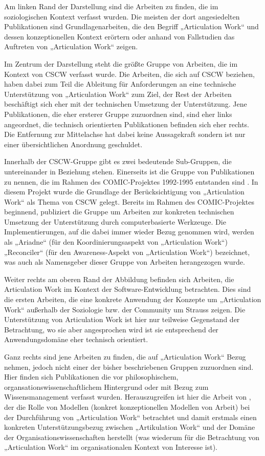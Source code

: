 Am linken Rand der Darstellung sind die Arbeiten zu finden, die im soziologischen Kontext verfasst wurden. Die meisten der dort angesiedelten Publikationen sind Grundlagenarbeiten, die den Begriff „Articulation Work“ und dessen konzeptionellen Kontext erörtern oder anhand von Fallstudien das Auftreten von „Articulation Work“ zeigen.

Im Zentrum der Darstellung steht die größte Gruppe von Arbeiten, die im Kontext von \gls{CSCW} verfasst wurde. Die Arbeiten, die sich auf \gls{CSCW} beziehen, haben dabei zum Teil die Ableitung für Anforderungen an eine technische Unterstützung von „Articulation Work“ zum Ziel, der Rest der Arbeiten beschäftigt sich eher mit der technischen Umsetzung der Unterstützung. Jene Publikationen, die eher ersterer Gruppe zuzuordnen sind, sind eher links angeordnet, die technisch orientierten Publikationen befinden sich eher rechts. Die Entfernung zur Mittelachse hat dabei keine Aussagekraft sondern ist nur einer übersichtlichen Anordnung geschuldet. 

Innerhalb der \gls{CSCW}-Gruppe gibt es zwei bedeutende Sub-Gruppen, die untereinander in Beziehung stehen. Einerseits ist die Gruppe von Publikationen zu nennen, die im Rahmen des COMIC-Projektes 1992-1995 entstanden sind \citep{Rodden95}. In diesem Projekt wurde die Grundlage der Berücksichtigung von „Articulation Work“ als Thema von \gls{CSCW} gelegt. Bereits im Rahmen des COMIC-Projektes beginnend, publiziert die Gruppe um \citeauthor{Simone00} Arbeiten zur konkreten technischen Umsetzung der Unterstützung durch computerbasierte Werkzeuge. Die Implementierungen, auf die dabei immer wieder Bezug genommen wird, werden als „Ariadne“ (für den Koordinierungsaspekt von „Articulation Work“) „Reconciler“ (für den Awareness-Aspekt von „Articulation Work“) bezeichnet, was auch als Namensgeber dieser Gruppe von Arbeiten herangezogen wurde.

Weiter rechts am oberen Rand der Abbildung befinden sich Arbeiten, die Articulation Work im Kontext der Software-Entwicklung betrachten. Dies sind die ersten Arbeiten, die eine konkrete Anwendung der Konzepte um „Articulation Work“ außerhalb der Soziologie bzw. der Community um Strauss zeigen. Die Unterstützung von Articulation Work ist hier nur teilweise Gegenstand der Betrachtung, wo sie aber angesprochen wird ist sie entsprechend der Anwendungsdomäne eher technisch orientiert.

Ganz rechts sind jene Arbeiten zu finden, die auf „Articulation Work“ Bezug nehmen, jedoch nicht einer der bisher beschriebenen Gruppen zuzuordnen sind. Hier finden sich Publikationen die vor philosophischem, organsationswissenschaftlichem Hintergrund oder mit Bezug zum Wissensmanagement verfasst wurden. Herauszugreifen ist hier die Arbeit von \citet{Jorgensen04}, der die Rolle von Modellen (konkret konzeptionellen Modellen von Arbeit) bei der Durchführung von „Articulation Work“ betrachtet und damit erstmals einen konkreten Unterstützungsbezug zwischen „Artikulation Work“ und der Domäne der Organisationswissenschaften herstellt (was wiederum für die Betrachtung von „Articulation Work“ im organisationalen Kontext von Interesse ist).

